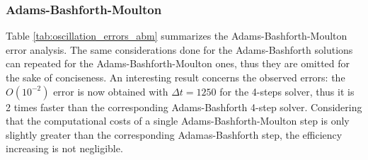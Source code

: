 \subsubsection{Adams-Bashforth-Moulton}

Table \ref{tab:oscillation_errors_abm} summarizes the Adams-Bashforth-Moulton error analysis. The same considerations done for the Adams-Bashforth solutions can repeated for the Adams-Bashforth-Moulton ones, thus they are omitted for the sake of conciseness. An interesting result concerns the observed errors: the $O(10^{-2})$ error is now obtained with $\Delta t=1250$ for the 4-steps solver, thus it is 2 times faster than the corresponding Adams-Bashforth 4-step solver. Considering that the computational costs of a single Adams-Bashforth-Moulton step is only slightly greater than the corresponding Adamas-Bashforth step, the efficiency increasing is not negligible.

